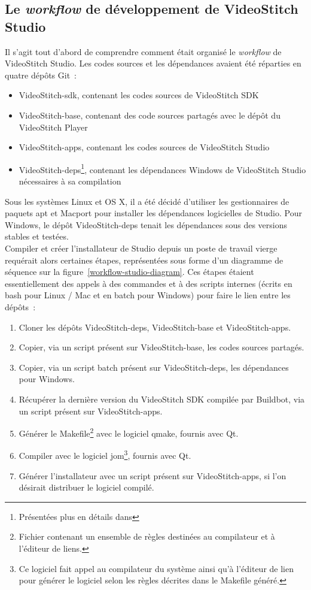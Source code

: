 \subsection{Le \textit{workflow} de développement de VideoStitch Studio}
\label{workflow-studio}
Il s'agit tout d'abord de comprendre comment était organisé le \textit{workflow} 
de VideoStitch Studio.
Les codes sources et les dépendances avaient été réparties en quatre dépôts Git~: 
\begin{itemize}
  \item VideoStitch-sdk, contenant les codes sources de VideoStitch SDK
  \item VideoStitch-base, contenant des code sources partagés avec le dépôt du VideoStitch Player
  \item VideoStitch-apps, contenant les codes sources de VideoStitch Studio
  \item VideoStitch-deps\footnote{Présentées plus en détails dans }, 
  contenant les dépendances Windows de VideoStitch Studio 
  nécessaires à sa compilation
\end{itemize}
Sous les systèmes Linux et OS X, il a été décidé d'utiliser les gestionnaires
de paquets apt et Macport pour installer les dépendances logicielles de Studio. Pour
Windows, le dépôt VideoStitch-deps tenait les dépendances sous des versions stables et testées.\\
\newline
Compiler et créer l'installateur de Studio depuis un poste de travail vierge requérait alors
certaines étapes, représentées sous forme d'un diagramme de séquence sur la figure~\ref{workflow-studio-diagram}.
Ces étapes étaient essentiellement des appels à des commandes et à des scripts internes
(écrits en bash pour Linux / Mac et en batch pour Windows) pour faire le lien entre les dépôts~:
\begin{enumerate}
  \item Cloner les dépôts VideoStitch-deps, VideoStitch-base et VideoStitch-apps.
  \item Copier, via un script présent sur VideoStitch-base, les codes sources partagés.
  \item Copier, via un script batch présent sur VideoStitch-deps, les dépendances pour Windows.
  \item Récupérer la dernière version du VideoStitch SDK compilée par Buildbot, 
  via un script présent sur VideoStitch-apps.
  \item Générer le Makefile\footnote{Fichier contenant un ensemble de règles destinées
  au compilateur et à l'éditeur de liens.} avec le logiciel qmake, fournis avec Qt.
  \item Compiler avec le logiciel jom\footnote{Ce logiciel fait appel au compilateur 
  du système ainsi qu'à l'éditeur de lien pour générer le logiciel selon les règles
  décrites dans le Makefile généré.}, fournis avec Qt.
  \item Générer l'installateur avec un script présent sur VideoStitch-apps, si
  l'on désirait distribuer le logiciel compilé.
\end{enumerate}
